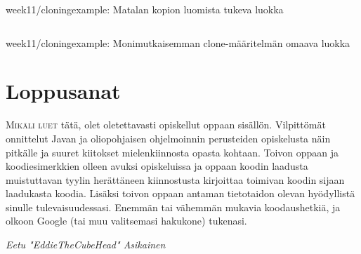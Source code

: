 \documentclass[openany]{book}
\newcommand{\newthought}[1]{\smallskip\textsc{#1}}
\newcommand{\code}[3]{
	\begin{listing}
		\linespread{0.85}
		\inputminted{java}{OhjelmointiopasEsimerkit/src/#1/#2.java}
		\caption{#1: #3}
		\label{#1/#2}
	\end{listing}
}
\begin{document}
\code{week11/cloningexample}{DataPoint}{Matalan kopion luomista tukeva luokka}
\code{week11/cloningexample}{ComplexDataPoint}{Monimutkaisemman clone-määritelmän omaava luokka}


\backmatter
\chapter{Loppusanat}
\label{theEnd}

\newthought{Mikäli luet} tätä, olet oletettavasti opiskellut oppaan sisällön. Vilpittömät
onnittelut Javan ja oliopohjaisen ohjelmoinnin perusteiden opiskelusta näin pitkälle ja suuret
kiitokset mielenkiinnosta opasta kohtaan. Toivon oppaan ja koodiesimerkkien olleen avuksi
opiskeluissa ja oppaan koodin laadusta muistuttavan tyylin herättäneen kiinnostusta kirjoittaa
toimivan koodin sijaan laadukasta koodia. Lisäksi toivon oppaan antaman tietotaidon olevan
hyödyllistä sinulle tulevaisuudessasi. Enemmän tai vähemmän mukavia koodaushetkiä, ja olkoon
Google (tai muu valitsemasi hakukone) tukenasi.


\textit{Eetu "EddieTheCubeHead" Asikainen}


\clearpage
\printglossary[title=Sanasto, toctitle=Sanasto]
\printglossary[type=java, title=Javan avainsanat, toctitle=Javan avainsanat]

\end{document}
